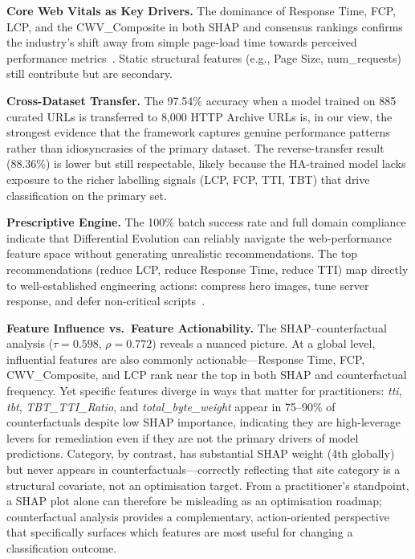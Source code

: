 \documentclass[sn-nature]{sn-jnl}
\begin{document}
\textbf{Core Web Vitals as Key Drivers.} The dominance of Response Time, FCP, LCP, and the CWV\_Composite in both SHAP and consensus rankings confirms the industry's shift away from simple page-load time towards perceived performance metrics~\cite{mathur2024, sehwag2024}. Static structural features (e.g., Page Size, num\_requests) still contribute but are secondary.

\textbf{Cross-Dataset Transfer.} The 97.54\% accuracy when a model trained on 885 curated URLs is transferred to 8,000 HTTP Archive URLs is, in our view, the strongest evidence that the framework captures genuine performance patterns rather than idiosyncrasies of the primary dataset. The reverse-transfer result (88.36\%) is lower but still respectable, likely because the HA-trained model lacks exposure to the richer labelling signals (LCP, FCP, TTI, TBT) that drive classification on the primary set.

\textbf{Prescriptive Engine.} The 100\% batch success rate and full domain compliance indicate that Differential Evolution can reliably navigate the web-performance feature space without generating unrealistic recommendations. The top recommendations (reduce LCP, reduce Response Time, reduce TTI) map directly to well-established engineering actions: compress hero images, tune server response, and defer non-critical scripts~\cite{vanriet2023, surianarayanan2023}.

\textbf{Feature Influence vs.\ Feature Actionability.} The SHAP--counterfactual analysis ($\tau = 0.598$, $\rho = 0.772$) reveals a nuanced picture. At a global level, influential features are also commonly actionable---Response Time, FCP, CWV\_Composite, and LCP rank near the top in both SHAP and counterfactual frequency. Yet specific features diverge in ways that matter for practitioners: \textit{tti}, \textit{tbt}, \textit{TBT\_TTI\_Ratio}, and \textit{total\_byte\_weight} appear in 75--90\% of counterfactuals despite low SHAP importance, indicating they are high-leverage levers for remediation even if they are not the primary drivers of model predictions. Category, by contrast, has substantial SHAP weight (4th globally) but never appears in counterfactuals---correctly reflecting that site category is a structural covariate, not an optimisation target. From a practitioner's standpoint, a SHAP plot alone can therefore be misleading as an optimisation roadmap; counterfactual analysis provides a complementary, action-oriented perspective that specifically surfaces which features are most useful for changing a classification outcome.
\end{document}
